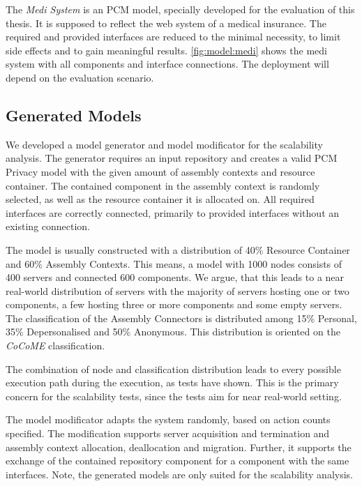 The \textit{Medi System} is an PCM model, specially developed for the evaluation of this thesis. It is supposed to reflect the web system of a medical insurance. The required and provided interfaces are reduced to the minimal necessity, to limit side effects and to gain meaningful results. \autoref{fig:model:medi} shows the medi system with all components and interface connections. The deployment will depend on the evaluation scenario.


\subsection{Generated Models}
\label{sec:Evaluation:models:generated}

We developed a model generator and model modificator for the scalability analysis. The generator requires an input repository and creates a valid PCM Privacy model with the given amount of assembly contexts and resource container. The contained component in the assembly context is randomly selected, as well as the resource container it is allocated on. All required interfaces are correctly connected, primarily to provided interfaces without an existing connection.

The model is usually constructed with a distribution of 40\% Resource Container and 60\% Assembly Contexts. This means, a model with 1000 nodes consists of 400 servers and connected 600 components. We argue, that this leads to a near real-world distribution of servers with the majority of servers hosting one or two components, a few hosting three or more components and some empty servers. The classification of the Assembly Connectors is distributed among 15\% Personal, 35\% Depersonalised and 50\% Anonymous. This distribution is oriented on the \textit{CoCoME} classification.

The combination of node and classification distribution leads to every possible execution path during the execution, as tests have shown. This is the primary concern for the scalability tests, since the tests aim for near real-world setting.

The model modificator adapts the system randomly, based on action counts specified. The modification supports server acquisition and termination and assembly context allocation, deallocation and migration. Further, it supports the exchange of the contained repository component for a component with the same interfaces. Note, the generated models are only suited for the scalability analysis. 



